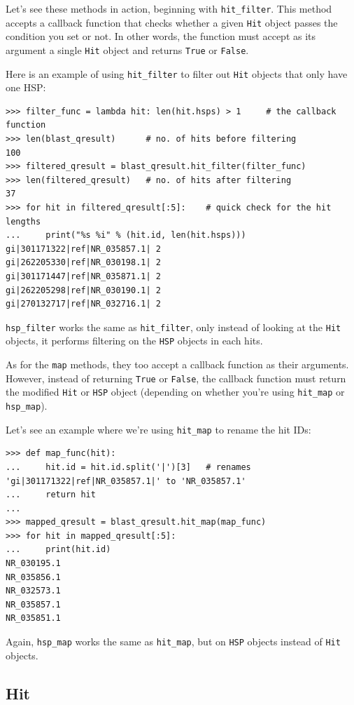 \documentclass{report}
\begin{document}
Let's see these methods in action, beginning with \verb|hit_filter|. This method
accepts a callback function that checks whether a given \verb|Hit| object passes
the condition you set or not. In other words, the function must accept as its
argument a single \verb|Hit| object and returns \verb|True| or \verb|False|.

Here is an example of using \verb|hit_filter| to filter out \verb|Hit| objects
that only have one HSP:

\begin{verbatim}
>>> filter_func = lambda hit: len(hit.hsps) > 1     # the callback function
>>> len(blast_qresult)      # no. of hits before filtering
100
>>> filtered_qresult = blast_qresult.hit_filter(filter_func)
>>> len(filtered_qresult)   # no. of hits after filtering
37
>>> for hit in filtered_qresult[:5]:    # quick check for the hit lengths
...     print("%s %i" % (hit.id, len(hit.hsps)))
gi|301171322|ref|NR_035857.1| 2
gi|262205330|ref|NR_030198.1| 2
gi|301171447|ref|NR_035871.1| 2
gi|262205298|ref|NR_030190.1| 2
gi|270132717|ref|NR_032716.1| 2
\end{verbatim}

\verb|hsp_filter| works the same as \verb|hit_filter|, only instead of looking
at the \verb|Hit| objects, it performs filtering on the \verb|HSP| objects in
each hits.

As for the \verb|map| methods, they too accept a callback function as their
arguments. However, instead of returning \verb|True| or \verb|False|, the
callback function must return the modified \verb|Hit| or \verb|HSP| object
(depending on whether you're using \verb|hit_map| or \verb|hsp_map|).

Let's see an example where we're using \verb|hit_map| to rename the hit IDs:

\begin{verbatim}
>>> def map_func(hit):
...     hit.id = hit.id.split('|')[3]   # renames 'gi|301171322|ref|NR_035857.1|' to 'NR_035857.1'
...     return hit
...
>>> mapped_qresult = blast_qresult.hit_map(map_func)
>>> for hit in mapped_qresult[:5]:
...     print(hit.id)
NR_030195.1
NR_035856.1
NR_032573.1
NR_035857.1
NR_035851.1
\end{verbatim}

Again, \verb|hsp_map| works the same as \verb|hit_map|, but on \verb|HSP|
objects instead of \verb|Hit| objects.

\subsection{Hit}
\label{sec:searchio-hit}
\end{document}

